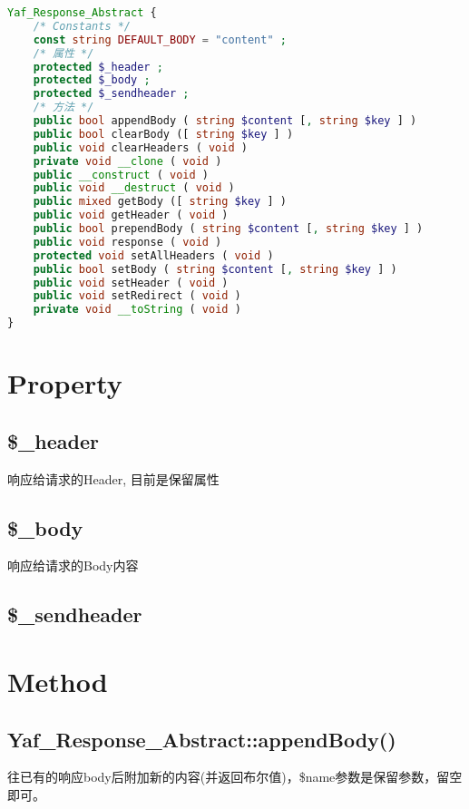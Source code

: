 \begin{lstlisting}[language=PHP]
Yaf_Response_Abstract {
    /* Constants */
    const string DEFAULT_BODY = "content" ;
    /* 属性 */
    protected $_header ;
    protected $_body ;
    protected $_sendheader ;
    /* 方法 */
    public bool appendBody ( string $content [, string $key ] )
    public bool clearBody ([ string $key ] )
    public void clearHeaders ( void )
    private void __clone ( void )
    public __construct ( void )
    public void __destruct ( void )
    public mixed getBody ([ string $key ] )
    public void getHeader ( void )
    public bool prependBody ( string $content [, string $key ] )
    public void response ( void )
    protected void setAllHeaders ( void )
    public bool setBody ( string $content [, string $key ] )
    public void setHeader ( void )
    public void setRedirect ( void )
    private void __toString ( void )
}
\end{lstlisting}

\section{Property}


\subsection{\$\_header}

响应给请求的Header, 目前是保留属性

\subsection{\$\_body}

响应给请求的Body内容
\subsection{\$\_sendheader}

\section{Method}


\subsection{Yaf\_Response\_Abstract::appendBody()}




往已有的响应body后附加新的内容(并返回布尔值)，\$name参数是保留参数，留空即可。




